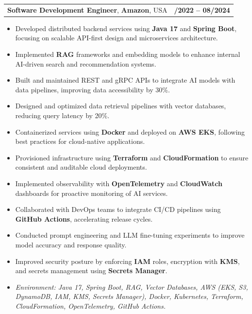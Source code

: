 \documentclass[letterpaper,11pt]{article}
\makeatletter
\newcommand{\resumeItem}[1]{
  \item\footnotesize{
    {#1 \vspace{-2pt}}
  }
}
\newcommand{\resumeSubheading}[4]{
  \vspace{-2pt}\item
    \begin{tabular*}{1.0\textwidth}[t]{l@{\extracolsep{\fill}}r}
      \textbf{\fontsize{10pt}{14pt}\selectfont #3}, \textbf{\fontsize{10pt}{14pt}\selectfont #1}, \fontsize{10pt}{14pt}\selectfont #4 & \textbf{\fontsize{10pt}{14pt}\selectfont #2} \\
    \end{tabular*}\vspace{-7pt}
}
\newcommand{\resumeItemListStart}{\begin{itemize}[leftmargin=*]}
\newcommand{\resumeItemListEnd}{\end{itemize}\vspace{-5pt}}
\makeatother
\begin{document}
\resumeSubheading
{Amazon}{10/2022 -- 08/2024}
{Software Development Engineer}{USA}
\resumeItemListStart
  \resumeItem{Developed distributed backend services using \textbf{Java 17} and \textbf{Spring Boot}, focusing on scalable API-first design and microservices architecture.}
  \resumeItem{Implemented \textbf{RAG} frameworks and embedding models to enhance internal AI-driven search and recommendation systems.}
  \resumeItem{Built and maintained REST and gRPC APIs to integrate AI models with data pipelines, improving data accessibility by 30\%.}
  \resumeItem{Designed and optimized data retrieval pipelines with vector databases, reducing query latency by 20\%.}
  \resumeItem{Containerized services using \textbf{Docker} and deployed on \textbf{AWS EKS}, following best practices for cloud-native applications.}
  \resumeItem{Provisioned infrastructure using \textbf{Terraform} and \textbf{CloudFormation} to ensure consistent and auditable cloud deployments.}
  \resumeItem{Implemented observability with \textbf{OpenTelemetry} and \textbf{CloudWatch} dashboards for proactive monitoring of AI services.}
  \resumeItem{Collaborated with DevOps teams to integrate CI/CD pipelines using \textbf{GitHub Actions}, accelerating release cycles.}
  \resumeItem{Conducted prompt engineering and LLM fine-tuning experiments to improve model accuracy and response quality.}
  \resumeItem{Improved security posture by enforcing \textbf{IAM} roles, encryption with \textbf{KMS}, and secrets management using \textbf{Secrets Manager}.}
  \resumeItem{\textit{Environment: Java 17, Spring Boot, RAG, Vector Databases, AWS (EKS, S3, DynamoDB, IAM, KMS, Secrets Manager), Docker, Kubernetes, Terraform, CloudFormation, OpenTelemetry, GitHub Actions.}}
\resumeItemListEnd
\end{document}
